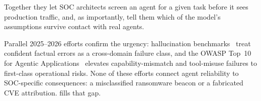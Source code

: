Together they let SOC architects screen an agent for a given task before
it sees production traffic, and, as importantly, tell them which of the
model's assumptions survive contact with real agents.

Parallel 2025--2026 efforts confirm the urgency: hallucination
benchmarks~\cite{bang2025hallulens} treat confident factual errors as
a cross-domain failure class, and the OWASP Top~10 for Agentic
Applications~\cite{owasp2026agentic} elevates capability-mismatch and
tool-misuse failures to first-class operational risks. None of these
efforts connect agent reliability to SOC-specific consequences: a
misclassified ransomware beacon or a fabricated CVE attribution.
\ARES{} fills that gap.
